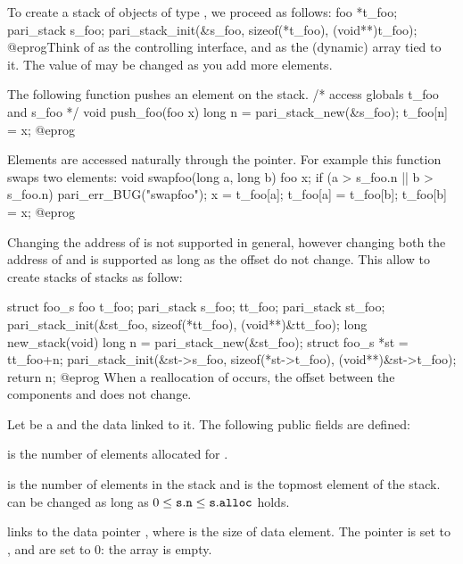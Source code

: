 To create a stack of objects of type , we proceed as follows:
\bprog
foo *t_foo;
pari_stack s_foo;
pari_stack_init(&s_foo, sizeof(*t_foo), (void**)t_foo);
@eprog\noindent Think of  as the controlling interface, and
 as the (dynamic) array tied to it. The value of 
may be changed as you add more elements.

The following function pushes an element on the stack.
\bprog
/* access globals t_foo and s_foo */
void push_foo(foo x)
{
  long n = pari_stack_new(&s_foo);
  t_foo[n] = x;
}
@eprog


Elements are accessed naturally through the  pointer.
For example this function swaps two elements:
\bprog
void swapfoo(long a, long b)
{
  foo x;
  if (a > s_foo.n || b > s_foo.n) pari_err_BUG("swapfoo");
  x        = t_foo[a];
  t_foo[a] = t_foo[b];
  t_foo[b] = x;
}
@eprog

Changing the address of  is not supported in general,
however changing both the address of  and 
is supported as long as the offset  do not change.
This allow to create stacks of stacks as follow:

\bprog
struct foo_s
{
  foo t_foo;
  pari_stack s_foo;
} tt_foo;
pari_stack st_foo;
pari_stack_init(&st_foo, sizeof(*tt_foo), (void**)&tt_foo);
long new_stack(void)
{
  long n = pari_stack_new(&st_foo);
  struct foo_s *st = tt_foo+n;
  pari_stack_init(&st->s_foo, sizeof(*st->t_foo), (void**)&st->t_foo);
  return n;
}
@eprog
When a reallocation of  occurs, the offset between the components
 and  does not change.

Let  be a  and  the data linked to it. The
following public fields are defined:

\item {} is the number of elements allocated for .

\item {} is the number of elements in the stack and  is
the topmost element of the stack.   can be changed as long as
$0\leq{\tt s.n}\leq{\tt s.alloc}$ holds.

 links
 to the data pointer , where  is the size of
data element. The pointer  is set to ,  and
 are set to $0$: the array is empty.

